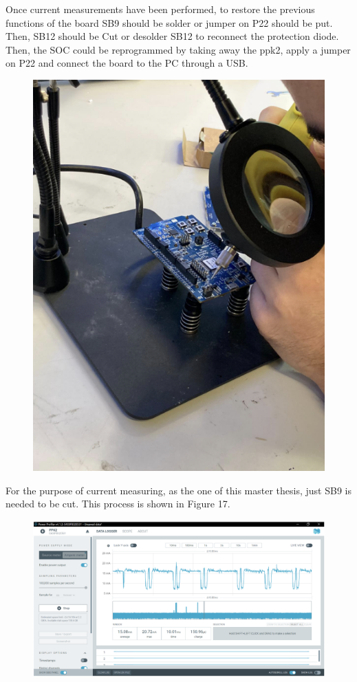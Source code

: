 \documentclass{Configuration_Files/PoliMi3i_thesis}
\begin{document}
Once current measurements have been performed, to restore the previous functions of the board SB9 should be solder or jumper on P22 should be put. Then, SB12 should be Cut or desolder SB12 to reconnect the protection diode.
Then, the SOC could be reprogrammed by taking away the ppk2, apply a jumper on P22 and connect the board to the PC through a USB.

\begin{figure}[H]
    \centering
    \includegraphics[scale=0.3]{Test_Procedure/17.png}
    \label{fig:direct_communication_board_PC}
\end{figure}

For the purpose of current measuring, as the one of this master thesis, just SB9 is needed to be cut. This process is shown in Figure 17.

\begin{figure}[H]
    \centering
    \includegraphics[scale=0.3]{Test_Procedure/18.png}
    \label{fig:direct_communication_board_PC}
\end{figure}
\end{document}
